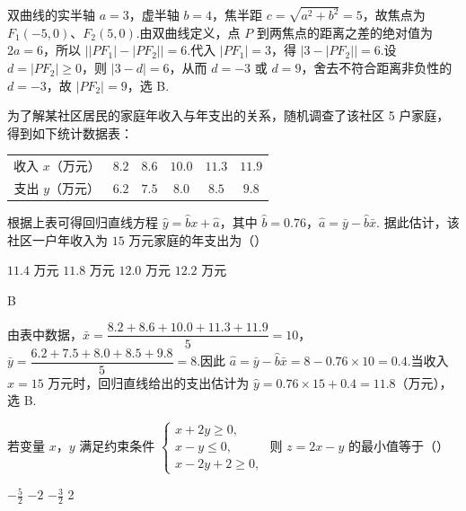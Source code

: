 \begin{solution}
双曲线的实半轴 \(a=3\)，虚半轴 \(b=4\)，焦半距 \(c=\sqrt{a^2+b^2}=5\)，故焦点为 \(F_1(-5,0)\)、\(F_2(5,0)\).由双曲线定义，点 \(P\) 到两焦点的距离之差的绝对值为 \(2a=6\)，所以
\(\bigl||PF_1|-|PF_2|\bigr|=6\).代入 \(|PF_1|=3\)，得 \(|3-|PF_2||=6\).设 \(d=|PF_2|\geqslant0\)，则 \(|3-d|=6\)，从而 \(d=-3\) 或 \(d=9\)，舍去不符合距离非负性的 \(d=-3\)，故 \(|PF_2|=9\)，选 B.
\end{solution}

\begin{problem}
为了解某社区居民的家庭年收入与年支出的关系，随机调查了该社区 5 户家庭，得到如下统计数据表：

\begin{center}
\begin{tabular}{c|ccccc}
收入 \(x\)（万元） & \(8.2\) & \(8.6\) & \(10.0\) & \(11.3\) & \(11.9\) \\
支出 \(y\)（万元） & \(6.2\) & \(7.5\) & \(8.0\) & \(8.5\) & \(9.8\)
\end{tabular}
\end{center}

根据上表可得回归直线方程 \(\hat{y}=\hat{b}x+\hat{a}\)，其中 \(\hat{b}=0.76\)，\(\hat{a}=\bar{y}-\hat{b}\bar{x}\). 据此估计，该社区一户年收入为 \(15\) 万元家庭的年支出为（\quad）

\choices
    {\(11.4\text{~万元}\)}
    {\(11.8\text{~万元}\)}
    {\(12.0\text{~万元}\)}
    {\(12.2\text{~万元}\)}
\end{problem}

\begin{answer}
B
\end{answer}

\begin{solution}
由表中数据，\(\bar{x}=\dfrac{8.2+8.6+10.0+11.3+11.9}{5}=10\)，\(\bar{y}=\dfrac{6.2+7.5+8.0+8.5+9.8}{5}=8\).因此
\(\hat{a}=\bar{y}-\hat{b}\bar{x}=8-0.76\times10=0.4\).当收入 \(x=15\) 万元时，回归直线给出的支出估计为
\(\hat{y}=0.76\times15+0.4=11.8\)（万元），选 B.
\end{solution}

\begin{problem}
若变量 \(x\)，\(y\) 满足约束条件 \(\begin{cases}
x + 2y \geqslant 0,\\
x - y \leqslant 0,\\
x - 2y + 2 \geqslant 0,
\end{cases}\) 则 \(z = 2x - y\) 的最小值等于（\quad）

\choices
    {\(-\frac{5}{2}\)}
    {\(-2\)}
    {\(-\frac{3}{2}\)}
    {2}
\end{problem}


